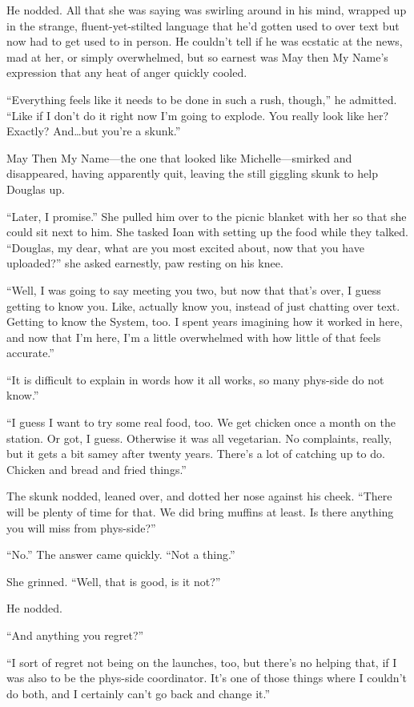 He nodded. All that she was saying was swirling around in his mind, wrapped up in the strange, fluent-yet-stilted language that he'd gotten used to over text but now had to get used to in person. He couldn't tell if he was ecstatic at the news, mad at her, or simply overwhelmed, but so earnest was May then My Name's expression that any heat of anger quickly cooled.

``Everything feels like it needs to be done in such a rush, though,'' he admitted. ``Like if I don't do it right now I'm going to explode. You really look like her? Exactly? And\ldots{}but you're a skunk.''

May Then My Name---the one that looked like Michelle---smirked and disappeared, having apparently quit, leaving the still giggling skunk to help Douglas up.

``Later, I promise.'' She pulled him over to the picnic blanket with her so that she could sit next to him. She tasked Ioan with setting up the food while they talked. ``Douglas, my dear, what are you most excited about, now that you have uploaded?'' she asked earnestly, paw resting on his knee.

``Well, I was going to say meeting you two, but now that that's over, I guess getting to know you. Like, actually know you, instead of just chatting over text. Getting to know the System, too. I spent years imagining how it worked in here, and now that I'm here, I'm a little overwhelmed with how little of that feels accurate.''

``It is difficult to explain in words how it all works, so many phys-side do not know.''

``I guess I want to try some real food, too. We get chicken once a month on the station. Or got, I guess. Otherwise it was all vegetarian. No complaints, really, but it gets a bit samey after twenty years. There's a lot of catching up to do. Chicken and bread and fried things.''

The skunk nodded, leaned over, and dotted her nose against his cheek. ``There will be plenty of time for that. We did bring muffins at least. Is there anything you will miss from phys-side?''

``No.'' The answer came quickly. ``Not a thing.''

She grinned. ``Well, that is good, is it not?''

He nodded.

``And anything you regret?''

``I sort of regret not being on the launches, too, but there's no helping that, if I was also to be the phys-side coordinator. It's one of those things where I couldn't do both, and I certainly can't go back and change it.''

